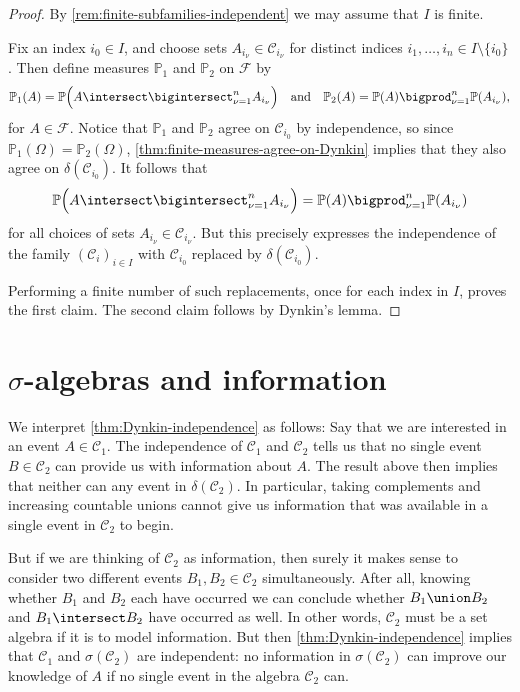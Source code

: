 \documentclass[article, a4paper, 11pt, oneside]{memoir}
\numberwithin{equation}{chapter}
\newcommand{\calF}{\mathcal{F}}
\newcommand{\calC}{\mathcal{C}}
\renewcommand{\P}{\mathbb{P}}
\begin{document}
\begin{proof}
    By \cref{rem:finite-subfamilies-independent} we may assume that $I$ is finite.

    Fix an index $i_0 \in I$, and choose sets $A_{i_\nu} \in \calC_{i_\nu}$ for distinct indices $i_1, \ldots, i_n \in I \setminus \{i_0\}$. Then define measures $\P_1$ and $\P_2$ on $\calF$ by
    \begin{equation*}
        \P_1(A)
            = \P \Bigl( A \intersect \bigintersect_{\nu = 1}^n A_{i_\nu} \Bigr)
        \quad \text{and} \quad
        \P_2(A)
            = \P(A) \bigprod_{\nu = 1}^n \P(A_{i_\nu}),
    \end{equation*}
    for $A \in \calF$. Notice that $\P_1$ and $\P_2$ agree on $\calC_{i_0}$ by independence, so since $\P_1(\Omega) = \P_2(\Omega)$, \cref{thm:finite-measures-agree-on-Dynkin} implies that they also agree on $\delta(\calC_{i_0})$. It follows that
    \begin{equation*}
        \P \Bigl( A \intersect \bigintersect_{\nu = 1}^n A_{i_\nu} \Bigr)
            = \P(A) \bigprod_{\nu = 1}^n \P(A_{i_\nu})
    \end{equation*}
    for all choices of sets $A_{i_\nu} \in \calC_{i_\nu}$. But this precisely expresses the independence of the family $(\calC_i)_{i \in I}$ with $\calC_{i_0}$ replaced by $\delta(\calC_{i_0})$.

    Performing a finite number of such replacements, once for each index in $I$, proves the first claim. The second claim follows by Dynkin's lemma.
\end{proof}


\section[Sigma-algebras and information][$\sigma$-algebras and information]{$\sigma$-algebras and information}

We interpret \cref{thm:Dynkin-independence} as follows: Say that we are interested in an event $A \in \calC_1$. The independence of $\calC_1$ and $\calC_2$ tells us that no single event $B \in \calC_2$ can provide us with information about $A$. The result above then implies that neither can any event in $\delta(\calC_2)$. In particular, taking complements and increasing countable unions cannot give us information that was available in a single event in $\calC_2$ to begin.

But if we are thinking of $\calC_2$ as information, then surely it makes sense to consider two different events $B_1, B_2 \in \calC_2$ simultaneously. After all, knowing whether $B_1$ and $B_2$ each have occurred we can conclude whether $B_1 \union B_2$ and $B_1 \intersect B_2$ have occurred as well. In other words, $\calC_2$ must be a set algebra if it is to model information. But then \cref{thm:Dynkin-independence} implies that $\calC_1$ and $\sigma(\calC_2)$ are independent: no information in $\sigma(\calC_2)$ can improve our knowledge of $A$ if no single event in the algebra $\calC_2$ can.
\end{document}
